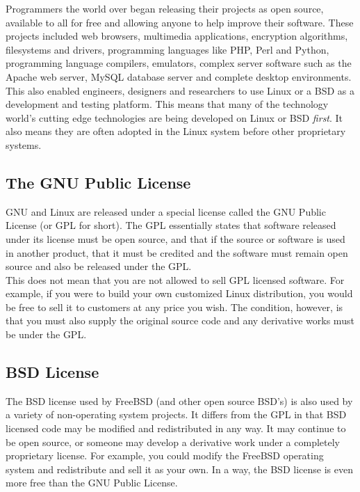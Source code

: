 Programmers the world over began releasing their projects as open source, available to all for free and allowing anyone to help improve their software.  These projects included web browsers, multimedia applications, encryption algorithms, filesystems and drivers, programming languages like PHP, Perl and Python, programming language compilers, emulators, complex server software such as the Apache web server, MySQL database server and complete desktop environments.\\

This also enabled engineers, designers and researchers to use Linux or a BSD as a development and testing platform.  This means that many of the technology world's cutting edge technologies are being developed on Linux or BSD \textit{first}.  It also means they are often adopted in the Linux system before other proprietary systems.\\

\subsection{The GNU Public License}

GNU and Linux are released under a special license called the GNU Public License (or GPL for short).  The GPL essentially states that software released under its license must be open source, and that if the source or software is used in another product, that it must be credited and the software must remain open source and also be released under the GPL.\\

This does not mean that you are not allowed to sell GPL licensed software.  For example, if you were to build your own customized Linux distribution, you would be free to sell it to customers at any price you wish.  The condition, however, is that you must also supply the original source code and any derivative works must be under the GPL.

\subsection{BSD License}

The BSD license used by FreeBSD (and other open source BSD's) is also used by a variety of non-operating system projects.  It differs from the GPL in that BSD licensed code may be modified and redistributed in any way.  It may continue to be open source, or someone may develop a derivative work under a completely proprietary license.  For example, you could modify the FreeBSD operating system and redistribute and sell it as your own.  In a way, the BSD license is even more free than the GNU Public License.

